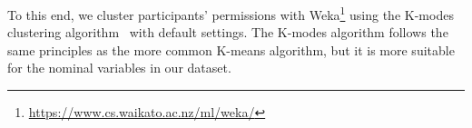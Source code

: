 To this end, we cluster participants' permissions with Weka\footnote{\url{https://www.cs.waikato.ac.nz/ml/weka/}} using the K-modes clustering algorithm~\cite{chaturvedi2001k} with default settings. The K-modes algorithm follows the same principles as the more common K-means algorithm, but it is more suitable for the nominal variables in our dataset.


